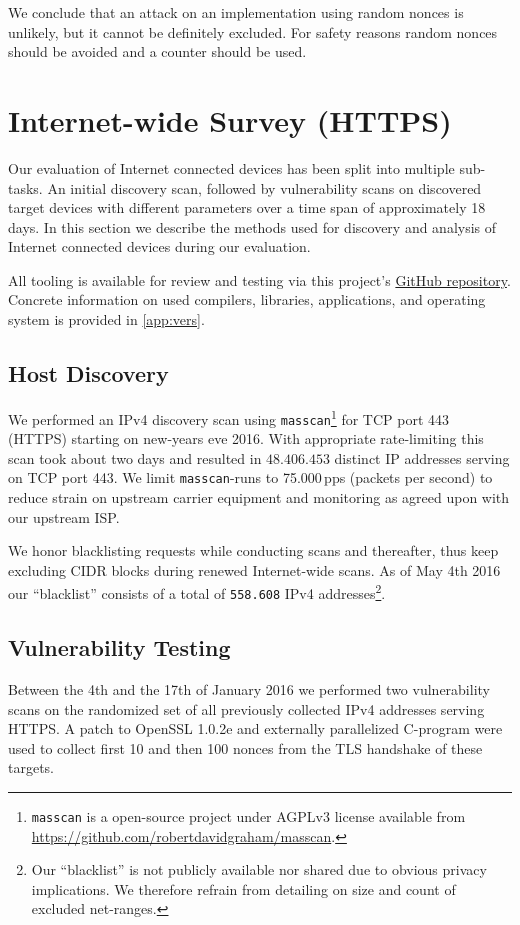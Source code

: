 \documentclass[10pt, a4paper]{article}
\begin{document}
We conclude that an attack on an implementation using random nonces is unlikely, but it cannot be
definitely excluded.
For safety reasons random nonces should be avoided and a counter should be used.

\section{Internet-wide Survey (HTTPS)}
Our evaluation of Internet connected devices has been split into multiple sub-tasks. An initial discovery scan, followed by vulnerability scans on discovered target devices
with different parameters over a time span of approximately 18 days. In this section we describe the methods used for discovery and analysis of Internet connected
devices during our evaluation.

All tooling is available for review and testing via this project's \href{https://github.com/nonce-disrespect/nonce-disrespect/}{GitHub repository}. Concrete information on used compilers, libraries, applications, and operating system is provided in \cref{app:vers}.

\subsection{Host Discovery}
We performed an IPv4 discovery scan using \texttt{masscan}\footnote{\texttt{masscan} is a open-source project under AGPLv3 license available from \url{https://github.com/robertdavidgraham/masscan}.} for TCP port 443 (HTTPS) starting on new-years eve 2016. With appropriate rate-limiting this scan took about two days
and resulted in $48.406.453$ distinct IP addresses serving on TCP port 443. We limit \texttt{masscan}-runs to 75.000\,pps (packets per second) to reduce
strain on upstream carrier equipment and monitoring as agreed upon with our upstream ISP.

We honor blacklisting requests while conducting scans and thereafter, thus keep excluding CIDR blocks during renewed Internet-wide scans. As of May 4th 2016 our ``blacklist'' consists of a total of \texttt{558.608} IPv4 addresses\footnote{Our ``blacklist'' is not publicly available nor shared due to obvious privacy implications. We therefore refrain from detailing on size and count of excluded net-ranges.}.

\subsection{Vulnerability Testing}
Between the 4th and the 17th of January 2016 we performed two vulnerability scans on the randomized set of all previously collected IPv4 addresses serving HTTPS.
A patch to OpenSSL 1.0.2e and externally parallelized C-program were used to collect first 10 and then 100 nonces from the TLS handshake of these targets.
\end{document}
